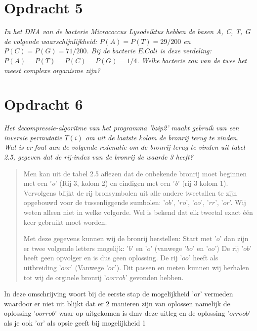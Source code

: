 \section{Opdracht 5}
\emph{In het DNA van de bacterie \emph{Micrococcus Lysodeiktus} hebben de basen \emph{A, C, T, G} de volgende waarschijnlijkheid: $P(A)=P(T)=29/200$ en $P(C)=P(G)=71/200$. Bij de bacterie $E. Coli$ is deze verdeling: $P(A)=P(T)=P(C)=P(G)=1/4$. Welke bacterie zou van de twee het meest complexe organisme zijn?}

\section{Opdracht 6}
\emph{Het decompressie-algoritme van het programma '\emph{bzip2}' maakt gebruik van een inversie permutatie $T(i)$ om uit de laatste kolom de bronrij terug te vinden. Wat is er fout aan de volgende redenatie om de bronrij terug te vinden uit tabel 2.5, gegeven dat de rij-index van de bronrij de waarde 3 heeft?}

\begin{quote}
Men kan uit de tabel 2.5 aflezen dat de onbekende bronrij moet beginnen met een '\emph{o}' (Rij 3, kolom 2) en eindigen met een '\emph{b}' (rij 3 kolom 1). Vervolgens blijkt de rij bronsymbolen uit alle andere tweetallen te zijn opgebouwd voor de tussenliggende sumbolen: '$ob$', '$ro$', '$oo$', '$rr$', '$or$'. Wij weten alleen niet in welke volgorde. Wel is bekend dat elk tweetal exact \'{e}\'{e}n keer gebruikt moet worden.

Met deze gegevens kunnen wij de bronrij herstellen: Start met '$o$' dan zijn er twee volgende letters mogelijk: '$b$' en '$o$' (vanwege '$bo$' en '$oo$') De rij '$ob$' heeft geen opvolger en is dus geen oplossing. De rij '$oo$' heeft als uitbreiding '$oor$' (Vanwege '$or$'). Dit passen en meten kunnen wij herhalen tot wij de orginele bronrij '$oorrob$' gevonden hebben.
\end{quote}

In deze omschrijving woort bij de eerste stap de mogelijkheid 'or' vermeden waardoor er niet uit blijkt dat er 2 manieren zijn van oplossen namelijk de oplossing '$oorrob$' waar op uitgekomen is dmv deze uitleg en de oplossing '$orroob$' als je ook 'or' als opsie geeft bij mogelijkheid 1
